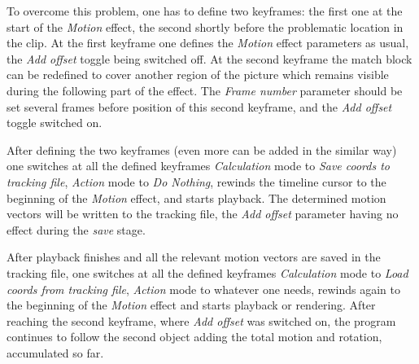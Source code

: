 \begin{description}
    To overcome this problem, one has to define two keyframes: the first one at
    the start of the \textit{Motion} effect, the second shortly before the problematic
    location in the clip.  At the first keyframe one defines the \textit{Motion} effect
    parameters as usual, the \textit{Add offset} toggle being switched off.  At the
    second keyframe the match block can be redefined to cover another region of
    the picture which remains visible during the following part of the effect.
    The \textit{Frame number} parameter should be set several frames before position of this second keyframe, and the \textit{Add offset} toggle switched on.
    
    After defining the two keyframes (even more can be added in the similar way)
    one switches at all the defined keyframes \textit{Calculation} mode to \textit{Save coords
    to tracking file}, \textit{Action} mode to \textit{Do Nothing}, rewinds the timeline cursor
    to the beginning of the \textit{Motion} effect, and starts playback.  The determined
    motion vectors will be written to the tracking file, the \textit{Add offset}
    parameter having no effect during the \textit{save} stage.
    
    After playback finishes and all the relevant motion vectors are saved in the
    tracking file, one switches at all the defined keyframes \textit{Calculation} mode to
    \textit{Load coords from tracking file}, \textit{Action} mode to whatever one needs, rewinds again to the beginning of the \textit{Motion} effect and starts playback or
    rendering.  After reaching the second keyframe, where \textit{Add offset} was
    switched on, the program continues to follow the second object adding the
    total motion and rotation, accumulated so far.
    

\end{description}
